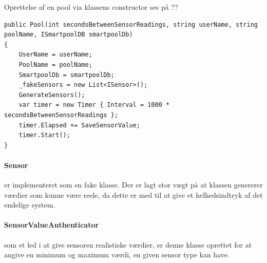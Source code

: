 Oprettelse af en pool via klassens constructor ses på ??
\begin{lstlisting}[caption=Server.FakePool.Constructor, label=code:ServerFakePoolConstructor]
public Pool(int secondsBetweenSensorReadings, string userName, string poolName, ISmartpoolDB smartpoolDb)
{
	UserName = userName;
	PoolName = poolName;
	SmartpoolDb = smartpoolDb;
	_fakeSensors = new List<ISensor>();
	GenerateSensors();
	var timer = new Timer { Interval = 1000 * secondsBetweenSensorReadings };
	timer.Elapsed += SaveSensorValue;
	timer.Start();
}
\end{lstlisting}

\paragraph{Sensor} er implementeret som en fake klasse. Der er lagt stor vægt på at klassen genererer værdier som kunne være reele, da dette er med til at give et helhedsindtryk af det endelige system. 

\paragraph{SensorValueAuthenticator} som et led i at give sensoren realistiske værdier, er denne klasse oprettet for at angive en minimum og maximum værdi, en given sensor type kan have.